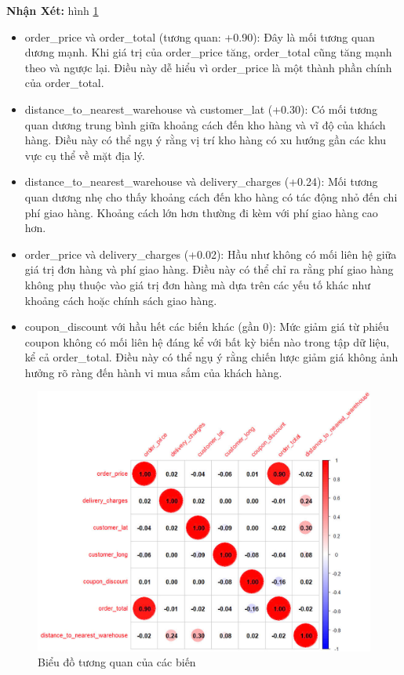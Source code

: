 \textbf{Nhận Xét:} hình \ref{fig:4.9}
\begin{itemize}
    \item order\_price và order\_total (tương quan: +0.90):
    Đây là mối tương quan dương mạnh. Khi giá trị của order\_price tăng, order\_total cũng tăng mạnh theo và ngược lại. Điều này dễ hiểu vì order\_price là một thành phần chính của order\_total.
    
    \item distance\_to\_nearest\_warehouse và customer\_lat (+0.30):
    Có mối tương quan dương trung bình giữa khoảng cách đến kho hàng và vĩ độ của khách hàng. Điều này có thể ngụ ý rằng vị trí kho hàng có xu hướng gần các khu vực cụ thể về mặt địa lý.
    
    \item distance\_to\_nearest\_warehouse và delivery\_charges (+0.24):
    Mối tương quan dương nhẹ cho thấy khoảng cách đến kho hàng có tác động nhỏ đến chi phí giao hàng. Khoảng cách lớn hơn thường đi kèm với phí giao hàng cao hơn.
    
    \item order\_price và delivery\_charges (+0.02):
    Hầu như không có mối liên hệ giữa giá trị đơn hàng và phí giao hàng. Điều này có thể chỉ ra rằng phí giao hàng không phụ thuộc vào giá trị đơn hàng mà dựa trên các yếu tố khác như khoảng cách hoặc chính sách giao hàng.
    
    \item coupon\_discount với hầu hết các biến khác (gần 0):
    Mức giảm giá từ phiếu coupon không có mối liên hệ đáng kể với bất kỳ biến nào trong tập dữ liệu, kể cả order\_total. Điều này có thể ngụ ý rằng chiến lược giảm giá không ảnh hưởng rõ ràng đến hành vi mua sắm của khách hàng.
\end{itemize}
\begin{figure}[!htbp]
    \centering
    \includegraphics[width=0.8\linewidth]{graphics/tq.jpg}
    \caption{Biểu đồ tương quan của các biến}
    \label{fig:4.9}
\end{figure}